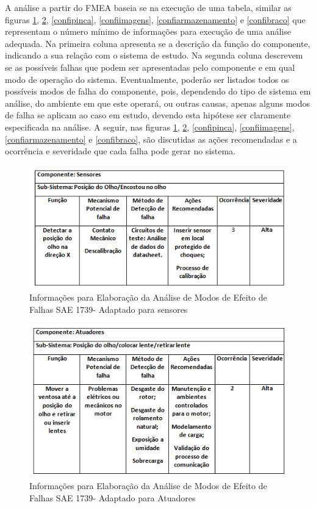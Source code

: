 A análise a partir do FMEA baseia se na execução de uma tabela, similar as figuras \ref{confisensores}, \ref{confiatuadores}, \ref{confipinca}, \ref{confiimagens}, \ref{confiarmazenamento} e \ref{confibraco} que representam o número mínimo de informações para execução de uma análise adequada. Na primeira coluna apresenta se a descrição da função do componente, indicando a sua relação com o sistema de estudo. Na segunda coluna descrevem se as possíveis falhas que podem ser apresentadas pelo componente e em qual modo de operação do sistema. Eventualmente, poderão ser listados todos os possíveis modos de falha do componente, pois, dependendo do tipo de sistema em análise, do ambiente em que este operará, ou outras causas, apenas alguns modos de falha se aplicam ao caso em estudo, devendo esta hipótese ser claramente especificada na análise. A seguir, nas figuras \ref{confisensores}, \ref{confiatuadores}, \ref{confipinca}, \ref{confiimagens}, \ref{confiarmazenamento} e \ref{confibraco}, são discutidas as ações recomendadas e a ocorrência e severidade que cada falha pode gerar no sistema.



\begin{figure}[H]
		\centering
			\includegraphics[scale=1.0]{figuras/confisensores.png}
		\caption{Informações para Elaboração da Análise de Modos de Efeito de Falhas SAE 1739- Adaptado para sensores \cite{sae}}
		\label{confisensores}
\end{figure}

\begin{figure}[H]
		\centering
			\includegraphics[scale=1.0]{figuras/confiatuadores.png}
		\caption{Informações para Elaboração da Análise de Modos de Efeito de Falhas SAE 1739- Adaptado para Atuadores \cite{sae}}
		\label{confiatuadores}
\end{figure}

